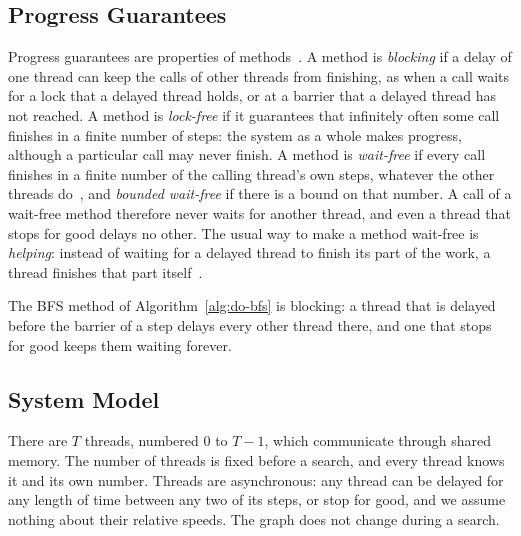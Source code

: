 \subsection{Progress Guarantees}
\label{sec:bg-progress}

Progress guarantees are properties of methods~\cite{aomp}. A method is \emph{blocking} if a delay of one thread can keep the calls of other threads from finishing, as when a call waits for a lock that a delayed thread holds, or at a barrier that a delayed thread has not reached. A method is \emph{lock-free} if it guarantees that infinitely often some call finishes in a finite number of steps: the system as a whole makes progress, although a particular call may never finish. A method is \emph{wait-free} if every call finishes in a finite number of the calling thread's own steps, whatever the other threads do~\cite{herlihy_waitfree}, and \emph{bounded wait-free} if there is a bound on that number. A call of a wait-free method therefore never waits for another thread, and even a thread that stops for good delays no other. The usual way to make a method wait-free is \emph{helping}: instead of waiting for a delayed thread to finish its part of the work, a thread finishes that part itself~\cite{aomp, kogan_fastwf}.

The BFS method of Algorithm~\ref{alg:do-bfs} is blocking: a thread that is delayed before the barrier of a step delays every other thread there, and one that stops for good keeps them waiting forever.

\subsection{System Model}
\label{sec:bg-model}

There are $T$ threads, numbered $0$ to $T-1$, which communicate through shared memory. The number of threads is fixed before a search, and every thread knows it and its own number. Threads are asynchronous: any thread can be delayed for any length of time between any two of its steps, or stop for good, and we assume nothing about their relative speeds. The graph does not change during a search.

